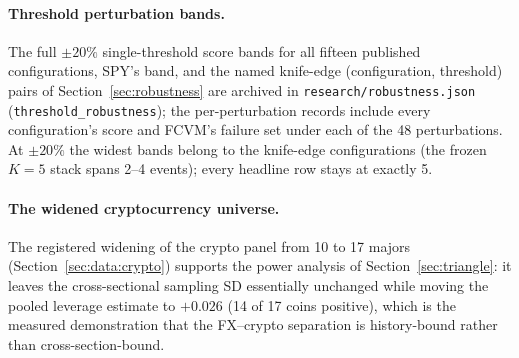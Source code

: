 \documentclass[11pt]{article}
\newcommand{\cfg}[1]{\mbox{#1}}
\begin{document}
\paragraph{Threshold perturbation bands.}
The full $\pm 20\%$ single-threshold score bands for all fifteen
published configurations, SPY's band, and the named knife-edge
(configuration, threshold) pairs of Section~\ref{sec:robustness} are
archived in \texttt{research/robustness.json}
(\texttt{threshold\_robustness}); the per-perturbation records include
every configuration's score and \cfg{FCVM}'s failure set under each of
the 48 perturbations. At $\pm 20\%$ the widest bands belong to the
knife-edge configurations (the frozen $K{=}5$ stack spans 2--4 events);
every headline row stays at exactly 5.

\paragraph{The widened cryptocurrency universe.}
The registered widening of the crypto panel from 10 to 17 majors
(Section~\ref{sec:data:crypto}) supports the power analysis of
Section~\ref{sec:triangle}: it leaves the cross-sectional sampling SD
essentially unchanged while moving the pooled leverage estimate to $+0.026$
(14 of 17 coins positive), which is the measured demonstration that the
FX--crypto separation is history-bound rather than cross-section-bound.
\end{document}
